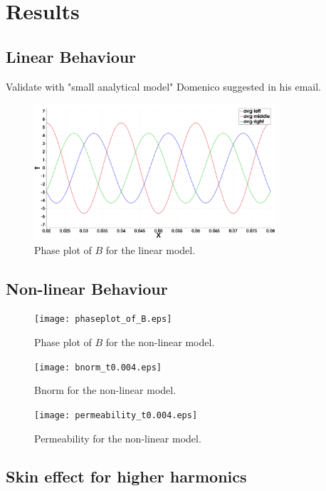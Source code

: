 \chapter{Results} \label{sec:results}

\section{Linear Behaviour}
Validate with "small analytical model" Domenico suggested in his email.

\begin{figure}[ht!]
    \centering
    \includegraphics[width=0.8\textwidth]{img/B_phase_plot_linear_mu.png}
    \caption{Phase plot of $B$ for the linear model.}
    \label{fig:linear_model}
\end{figure}


\section{Non-linear Behaviour}


\begin{figure}[t]
    \centering
    \texttt{[image: phaseplot\_of\_B.eps]}
    \caption{Phase plot of $B$ for the non-linear model.}
    \label{fig:nonlinear_phaseplot}
\end{figure}



\begin{figure}[t]
    \centering
    \texttt{[image: bnorm\_t0.004.eps]}
    \caption{Bnorm for the non-linear model.}
    \label{fig:nonlinear_bnorm}
\end{figure}


\begin{figure}[t]
    \centering
    \texttt{[image: permeability\_t0.004.eps]}
    \caption{Permeability for the non-linear model.}
    \label{fig:nonlinear_permeability}
\end{figure}

\section{Skin effect for higher harmonics}




